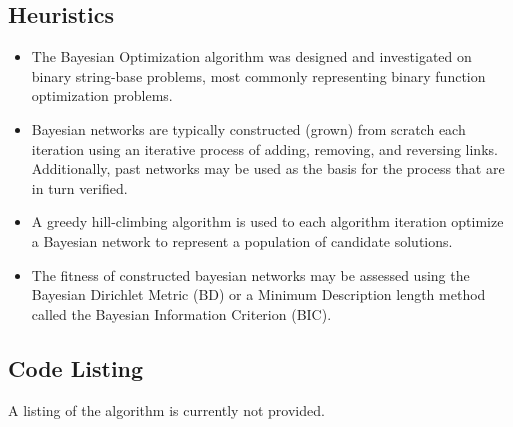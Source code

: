 \subsection{Heuristics}
\begin{itemize}
	\item The Bayesian Optimization algorithm was designed and investigated on binary string-base problems, most commonly representing binary function optimization problems.
	\item Bayesian networks are typically constructed (grown) from scratch each iteration using an iterative process of adding, removing, and reversing links. Additionally, past networks may be used as the basis for the process that are in turn verified.
	\item A greedy hill-climbing algorithm is used to each algorithm iteration optimize a Bayesian network to represent a population of candidate solutions.
	\item The fitness of constructed bayesian networks may be assessed using the Bayesian Dirichlet Metric (BD) or a Minimum Description length method called the Bayesian Information Criterion (BIC).
	
\end{itemize}

\subsection{Code Listing}
% 
% 
% 
A listing of the algorithm is currently not provided.

